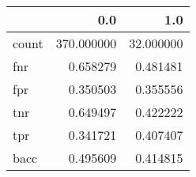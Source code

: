 \begin{tabular}{lrr}
\toprule
{} &         0.0 &        1.0 \\
\midrule
count &  370.000000 &  32.000000 \\
fnr   &    0.658279 &   0.481481 \\
fpr   &    0.350503 &   0.355556 \\
tnr   &    0.649497 &   0.422222 \\
tpr   &    0.341721 &   0.407407 \\
bacc  &    0.495609 &   0.414815 \\
\bottomrule
\end{tabular}
